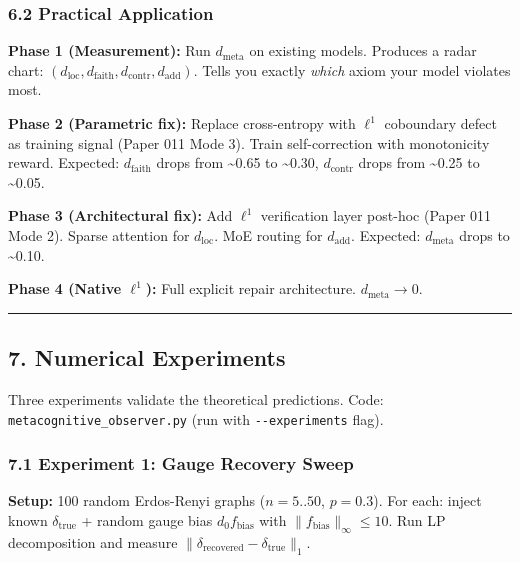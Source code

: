 \documentclass[
]{article}
\begin{document}
\subsubsection{6.2 Practical Application}\label{practical-application}

\textbf{Phase 1 (Measurement):} Run \(d_{\mathrm{meta}}\) on existing
models. Produces a radar chart:
\((d_{\mathrm{loc}}, d_{\mathrm{faith}}, d_{\mathrm{contr}}, d_{\mathrm{add}})\).
Tells you exactly \emph{which} axiom your model violates most.

\textbf{Phase 2 (Parametric fix):} Replace cross-entropy with \(\ell^1\)
coboundary defect as training signal (Paper 011 Mode 3). Train
self-correction with monotonicity reward. Expected:
\(d_{\mathrm{faith}}\) drops from \textasciitilde0.65 to
\textasciitilde0.30, \(d_{\mathrm{contr}}\) drops from
\textasciitilde0.25 to \textasciitilde0.05.

\textbf{Phase 3 (Architectural fix):} Add \(\ell^1\) verification layer
post-hoc (Paper 011 Mode 2). Sparse attention for \(d_{\mathrm{loc}}\).
MoE routing for \(d_{\mathrm{add}}\). Expected: \(d_{\mathrm{meta}}\)
drops to \textasciitilde0.10.

\textbf{Phase 4 (Native \(\ell^1\)):} Full explicit repair architecture.
\(d_{\mathrm{meta}} \to 0\).

\begin{center}\rule{0.5\linewidth}{0.5pt}\end{center}

\subsection{7. Numerical Experiments}\label{numerical-experiments}

Three experiments validate the theoretical predictions. Code:
\texttt{metacognitive\_observer.py} (run with \texttt{-\/-experiments}
flag).

\subsubsection{7.1 Experiment 1: Gauge Recovery
Sweep}\label{experiment-1-gauge-recovery-sweep}

\textbf{Setup:} 100 random Erdos-Renyi graphs (\(n = 5..50\),
\(p = 0.3\)). For each: inject known \(\delta_{\mathrm{true}}\) + random
gauge bias \(d_0 f_{\mathrm{bias}}\) with
\(\|f_{\mathrm{bias}}\|_\infty \leq 10\). Run LP decomposition and
measure \(\|\delta_{\mathrm{recovered}} - \delta_{\mathrm{true}}\|_1\).
\end{document}
